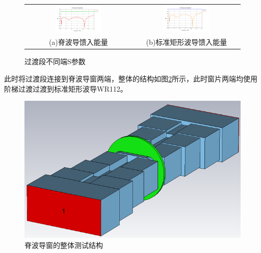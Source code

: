 \documentclass[master]{thesis-uestc}
\begin{document}
\begin{figure}[!htb]
    \small
    \centering
    \begin{tabular}{@{\ }c@{\ }c}
        \includegraphics[width=0.45\textwidth]{pic/chapter3/一端口馈入.png} & 
        \hspace{5pt}
        \includegraphics[width=0.45\textwidth]{pic/chapter3/二端口馈入.png}     \\
        \mbox{\small (a)脊波导馈入能量}                                                                               & 
        \mbox{\small (b)标准矩形波导馈入能量}                                                                                  \\
    \end{tabular}
    \caption{过渡段不同端S参数}
    \label{fig:过渡段不同端馈入的S参数}
\end{figure}

此时将过渡段连接到脊波导窗两端，整体的结构如图\ref{fig:脊波导窗的整体测试结构}所示，此时窗片两端均使用阶梯过渡过渡到标准矩形波导WR112。
\begin{figure}[!htb]
    \centering
    \includegraphics[width=0.5\linewidth]{pic/chapter3/脊波导窗整体测试结构.png}
    \caption{脊波导窗的整体测试结构}
    \label{fig:脊波导窗的整体测试结构}
\end{figure}
\end{document}
